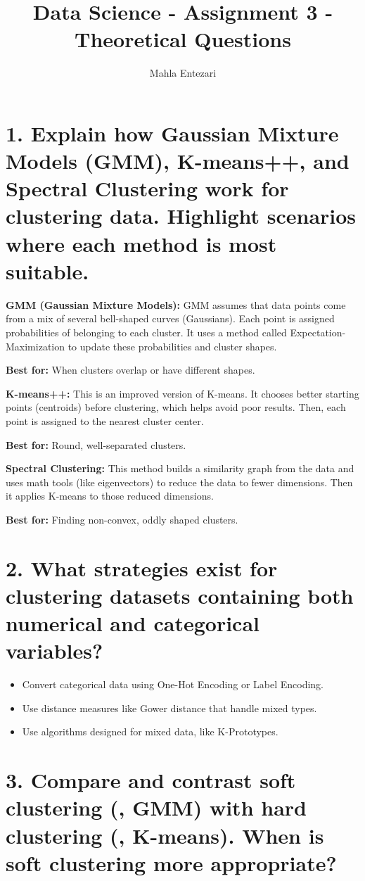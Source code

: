 \documentclass{article}
\title{Data Science - Assignment 3 - Theoretical Questions}
\author{Mahla Entezari}
\date{}
\begin{document}
\maketitle

\section*{1.
Explain how Gaussian Mixture Models (GMM), K-means++, and Spectral Clustering work for clustering data. Highlight scenarios where each method is most suitable.
}

\textbf{GMM (Gaussian Mixture Models):}  
GMM assumes that data points come from a mix of several bell-shaped curves (Gaussians). Each point is assigned probabilities of belonging to each cluster. It uses a method called Expectation-Maximization to update these probabilities and cluster shapes.

\textbf{Best for:} When clusters overlap or have different shapes.

\textbf{K-means++:}  
This is an improved version of K-means. It chooses better starting points (centroids) before clustering, which helps avoid poor results. Then, each point is assigned to the nearest cluster center.

\textbf{Best for:} Round, well-separated clusters.

\textbf{Spectral Clustering:}  
This method builds a similarity graph from the data and uses math tools (like eigenvectors) to reduce the data to fewer dimensions. Then it applies K-means to those reduced dimensions.

\textbf{Best for:} Finding non-convex, oddly shaped clusters.

\section*{2.
What strategies exist for clustering datasets containing both numerical and categorical variables?}



\begin{itemize}
  \item Convert categorical data using One-Hot Encoding or Label Encoding.
  \item Use distance measures like Gower distance that handle mixed types.
  \item Use algorithms designed for mixed data, like K-Prototypes.
\end{itemize}

\section*{3.
Compare and contrast soft clustering (, GMM) with hard clustering (, K-means). When is soft clustering more appropriate?}
\end{document}
